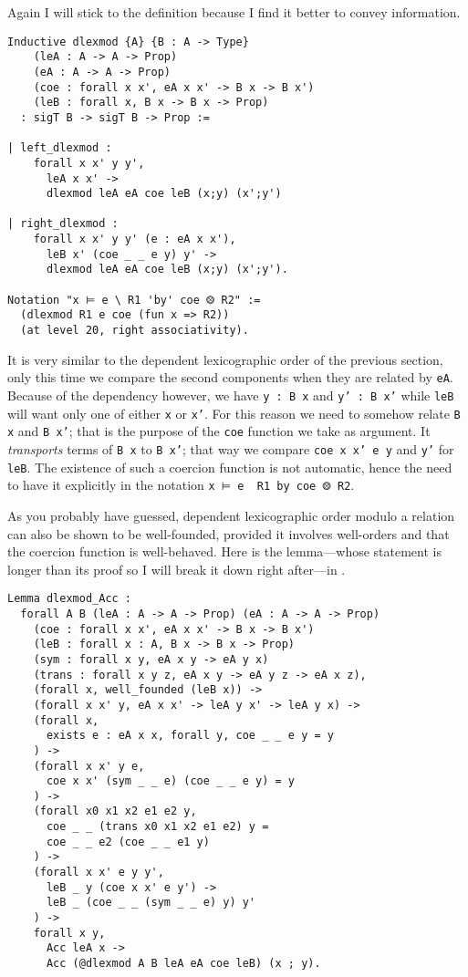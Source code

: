 Again I will stick to the \Coq definition because I find it better to convey
information.

\begin{verbatim}
Inductive dlexmod {A} {B : A -> Type}
    (leA : A -> A -> Prop)
    (eA : A -> A -> Prop)
    (coe : forall x x', eA x x' -> B x -> B x')
    (leB : forall x, B x -> B x -> Prop)
  : sigT B -> sigT B -> Prop :=

| left_dlexmod :
    forall x x' y y',
      leA x x' ->
      dlexmod leA eA coe leB (x;y) (x';y')

| right_dlexmod :
    forall x x' y y' (e : eA x x'),
      leB x' (coe _ _ e y) y' ->
      dlexmod leA eA coe leB (x;y) (x';y').

Notation "x ⊨ e \ R1 'by' coe ⨷ R2" :=
  (dlexmod R1 e coe (fun x => R2))
  (at level 20, right associativity).
\end{verbatim}

It is very similar to the dependent lexicographic order of the previous section,
only this time we compare the second components when they are related by
\texttt{eA}. Because of the dependency however, we have
\texttt{y : B x} and \texttt{y' : B x'} while
\texttt{leB} will want only one of either \texttt{x} or
\texttt{x'}.
For this reason we need to somehow relate \texttt{B x} and
\texttt{B x'}; that is the purpose of the \texttt{coe}
function we take as argument. It \emph{transports} terms of
\texttt{B x} to \texttt{B x'}; that way we compare
\texttt{coe x x' e y} and \texttt{y'} for
\texttt{leB}.
The existence of such a coercion function is not automatic, hence the need to
have it explicitly in the notation \texttt{x ⊨ e \ R1 by coe ⨷ R2}.

As you probably have guessed, dependent lexicographic order modulo a relation
can also be shown to be well-founded, provided it involves well-orders and that
the coercion function is well-behaved.
Here is the lemma---whose statement is longer than its proof so I will break it
down right after---in \Coq.
\begin{verbatim}
Lemma dlexmod_Acc :
  forall A B (leA : A -> A -> Prop) (eA : A -> A -> Prop)
    (coe : forall x x', eA x x' -> B x -> B x')
    (leB : forall x : A, B x -> B x -> Prop)
    (sym : forall x y, eA x y -> eA y x)
    (trans : forall x y z, eA x y -> eA y z -> eA x z),
    (forall x, well_founded (leB x)) ->
    (forall x x' y, eA x x' -> leA y x' -> leA y x) ->
    (forall x,
      exists e : eA x x, forall y, coe _ _ e y = y
    ) ->
    (forall x x' y e,
      coe x x' (sym _ _ e) (coe _ _ e y) = y
    ) ->
    (forall x0 x1 x2 e1 e2 y,
      coe _ _ (trans x0 x1 x2 e1 e2) y =
      coe _ _ e2 (coe _ _ e1 y)
    ) ->
    (forall x x' e y y',
      leB _ y (coe x x' e y') ->
      leB _ (coe _ _ (sym _ _ e) y) y'
    ) ->
    forall x y,
      Acc leA x ->
      Acc (@dlexmod A B leA eA coe leB) (x ; y).
\end{verbatim}

